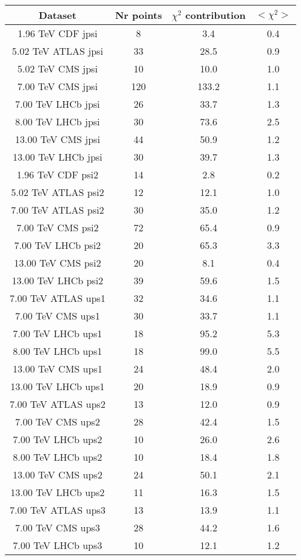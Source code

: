 \begin{table}[h!]
\centering
\begin{tabular}{c|c|c|c}
Dataset & Nr points & $\chi^2$ contribution & $<\chi^2>$ \\
\hline
1.96 TeV CDF jpsi & 8 & 3.4 & 0.4 \\
5.02 TeV ATLAS jpsi & 33 & 28.5 & 0.9 \\
5.02 TeV CMS jpsi & 10 & 10.0 & 1.0 \\
7.00 TeV CMS jpsi & 120 & 133.2 & 1.1 \\
7.00 TeV LHCb jpsi & 26 & 33.7 & 1.3 \\
8.00 TeV LHCb jpsi & 30 & 73.6 & 2.5 \\
13.00 TeV CMS jpsi & 44 & 50.9 & 1.2 \\
13.00 TeV LHCb jpsi & 30 & 39.7 & 1.3 \\
1.96 TeV CDF psi2 & 14 & 2.8 & 0.2 \\
5.02 TeV ATLAS psi2 & 12 & 12.1 & 1.0 \\
7.00 TeV ATLAS psi2 & 30 & 35.0 & 1.2 \\
7.00 TeV CMS psi2 & 72 & 65.4 & 0.9 \\
7.00 TeV LHCb psi2 & 20 & 65.3 & 3.3 \\
13.00 TeV CMS psi2 & 20 & 8.1 & 0.4 \\
13.00 TeV LHCb psi2 & 39 & 59.6 & 1.5 \\
7.00 TeV ATLAS ups1 & 32 & 34.6 & 1.1 \\
7.00 TeV CMS ups1 & 30 & 33.7 & 1.1 \\
7.00 TeV LHCb ups1 & 18 & 95.2 & 5.3 \\
8.00 TeV LHCb ups1 & 18 & 99.0 & 5.5 \\
13.00 TeV CMS ups1 & 24 & 48.4 & 2.0 \\
13.00 TeV LHCb ups1 & 20 & 18.9 & 0.9 \\
7.00 TeV ATLAS ups2 & 13 & 12.0 & 0.9 \\
7.00 TeV CMS ups2 & 28 & 42.4 & 1.5 \\
7.00 TeV LHCb ups2 & 10 & 26.0 & 2.6 \\
8.00 TeV LHCb ups2 & 10 & 18.4 & 1.8 \\
13.00 TeV CMS ups2 & 24 & 50.1 & 2.1 \\
13.00 TeV LHCb ups2 & 11 & 16.3 & 1.5 \\
7.00 TeV ATLAS ups3 & 13 & 13.9 & 1.1 \\
7.00 TeV CMS ups3 & 28 & 44.2 & 1.6 \\
7.00 TeV LHCb ups3 & 10 & 12.1 & 1.2 \\

\end{tabular}
\end{table}
